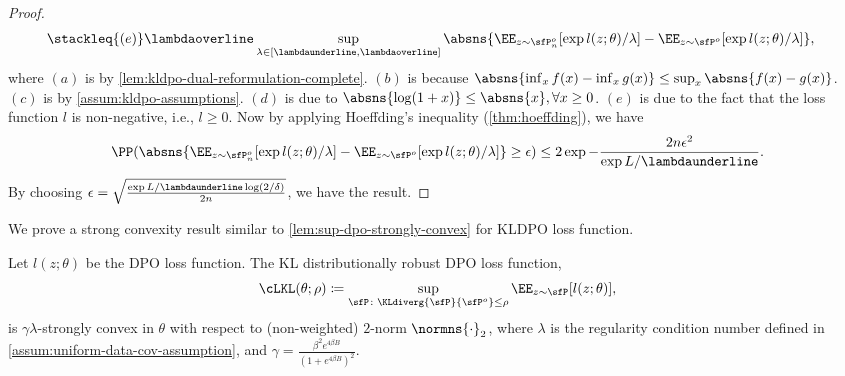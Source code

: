 \begin{proof}
\begin{align*}
    &\stackleq{(e)} \lambdaoverline\sup_{\lambda\in[\lambdaunderline,\lambdaoverline]} \absns{\EE_{z\sim\sfP^o_n}[\exp{l(z;\theta)}/\lambda] - \EE_{z\sim\sfP^o}[\exp{l(z;\theta)}/\lambda]},
\end{align*}
where $(a)$ is by \cref{lem:kldpo-dual-reformulation-complete}. $(b)$ is because $\absns{\inf_x f(x) - \inf_x g(x)}\leq \sup_x\absns{f(x)-g(x)}$. $(c)$ is by \cref{assum:kldpo-assumptions}. $(d)$ is due to $\absns{\log(1+x)}\leq \absns{x}, \forall x\geq 0$. $(e)$ is due to the fact that the loss function $l$ is non-negative, i.e., $l\geq 0$. Now by applying Hoeffding's inequality (\cref{thm:hoeffding}), we have
\begin{equation*}
    \PP(\absns{\EE_{z\sim\sfP^o_n}[\exp{l(z;\theta)}/\lambda] - \EE_{z\sim\sfP^o}[\exp{l(z;\theta)}/\lambda]} \geq \epsilon ) \leq 2\exp{-\frac{2n\epsilon^2}{\exp{L/\lambdaunderline}}}.
\end{equation*}
By choosing $\epsilon = \sqrt{\frac{\exp{L/\lambdaunderline}\log(2/\delta)}{2n}}$, we have the result.
\end{proof}
We prove a strong convexity result similar to \cref{lem:sup-dpo-strongly-convex} for KLDPO loss function.
\begin{lemma}\label{lem:sup-dpo-strongly-convex-kl}
    Let $l(z;\theta)$ be the DPO loss function. The KL distributionally robust DPO loss function,
    \begin{equation*}
     \cLKL(\theta;\rho) \coloneqq \sup_{\sfP\colon\KLdiverg{\sfP}{\sfP^o}\leq\rho} \EE_{z\sim\sfP}[l(z;\theta)],
    \end{equation*}
    is $\gamma\lambda$-strongly convex in $\theta$ with respect to (non-weighted) $2$-norm $\normns{\cdot}_2$, where $\lambda$ is the regularity condition number defined in \cref{assum:uniform-data-cov-assumption}, and $\gamma=\frac{\beta^2e^{4\beta B}}{(1+e^{4\beta B})^2}$.
\end{lemma}
